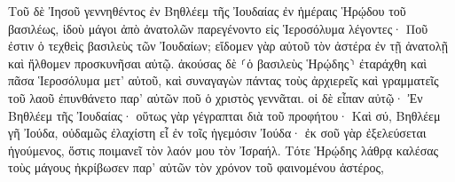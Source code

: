 \documentclass{openreader}
\begin{document}
Τοῦ δὲ Ἰησοῦ γεννηθέντος ἐν Βηθλέεμ τῆς Ἰουδαίας ἐν ἡμέραις Ἡρῴδου τοῦ βασιλέως, ἰδοὺ μάγοι ἀπὸ ἀνατολῶν παρεγένοντο εἰς Ἱεροσόλυμα 
λέγοντες· Ποῦ ἐστιν ὁ τεχθεὶς βασιλεὺς τῶν Ἰουδαίων; εἴδομεν γὰρ αὐτοῦ τὸν ἀστέρα ἐν τῇ ἀνατολῇ καὶ ἤλθομεν προσκυνῆσαι αὐτῷ. 
ἀκούσας δὲ ⸂ὁ βασιλεὺς Ἡρῴδης⸃ ἐταράχθη καὶ πᾶσα Ἱεροσόλυμα μετ’ αὐτοῦ, 
καὶ συναγαγὼν πάντας τοὺς ἀρχιερεῖς καὶ γραμματεῖς τοῦ λαοῦ ἐπυνθάνετο παρ’ αὐτῶν ποῦ ὁ χριστὸς γεννᾶται. 
οἱ δὲ εἶπαν αὐτῷ· Ἐν Βηθλέεμ τῆς Ἰουδαίας· οὕτως γὰρ γέγραπται διὰ τοῦ προφήτου· 
Καὶ σύ, Βηθλέεμ γῆ Ἰούδα, οὐδαμῶς ἐλαχίστη εἶ ἐν τοῖς ἡγεμόσιν Ἰούδα· ἐκ σοῦ γὰρ ἐξελεύσεται ἡγούμενος, ὅστις ποιμανεῖ τὸν λαόν μου τὸν Ἰσραήλ. 
Τότε Ἡρῴδης λάθρᾳ καλέσας τοὺς μάγους ἠκρίβωσεν παρ’ αὐτῶν τὸν χρόνον τοῦ φαινομένου ἀστέρος, 
\end{document}
